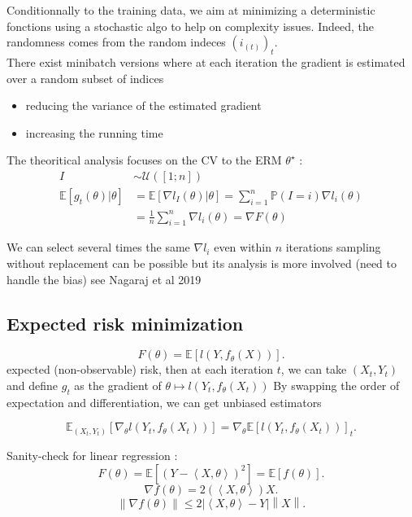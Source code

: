 Conditionnally to the training data, we aim at minimizing a deterministic fonctions using a stochastic algo to help on complexity issues. Indeed, the randomness comes from the random indeces $(i_(t))_t$. \\
There exist minibatch versions where at each iteration the gradient is estimated over a random subset of indices \\
\begin{itemize}
    \item reducing the variance of the estimated gradient
    \item increasing the running time
\end{itemize}
The theoritical analysis focuses on the CV to the ERM $\theta^{\star}$ :
\begin{align*}
    I &\sim \mathcal{U}([1; n]) \\
    \mathbb{E}[g_t(\theta) | \theta ] &= \mathbb{E}[ \nabla l_I (\theta ) | \theta ] = \sum_{i=1}^{n}\mathbb{P}(I = i) \nabla l_i (\theta ) \\
    &= \frac{1}{n} \sum_{i=1}^{n} \nabla l_i (\theta ) = \nabla F(\theta )
\end{align*}

We can select several times the same $\nabla l_i$ even within $n$ iterations sampling without replacement can be possible but its analysis is more involved (need to handle the bias) see Nagaraj et al 2019

\subsection{Expected risk minimization}

\[
    F(\theta ) = \mathbb{E}[l(Y, f_\theta (X))]
.\]
expected (non-observable) risk, then at each iteration $ t $, we can take $ (X_t, Y_t) $ and define $ g_t $ as the gradient of $ \theta \mapsto l(Y_t, f_\theta (X_t)) $ 
By swapping the order of expectation and differentiation, we can get unbiased estimators

\[
    \mathbb{E}_{(X_t,Y_t)}[\nabla_\theta l(Y_t, f_{\theta}(X_t)) ] = \nabla_{\theta} \mathbb{E}[l(Y_t, f_{\theta}(X_t))]_t
.\]

Sanity-check for linear regression : 
\[
    F(\theta ) = \mathbb{E} [ (Y - \left\langle X, \theta  \right\rangle )^2 ] = \mathbb{E}[ f(\theta )]
.\]
\[
    \nabla f(\theta ) = 2 ( \left\langle X, \theta  \right\rangle ) X
.\]
\[
    \left\| \nabla f(\theta ) \right\|  \leq 2 \left| \left\langle X, \theta  \right\rangle  - Y \right|  \left\| X \right\| 
.\]


